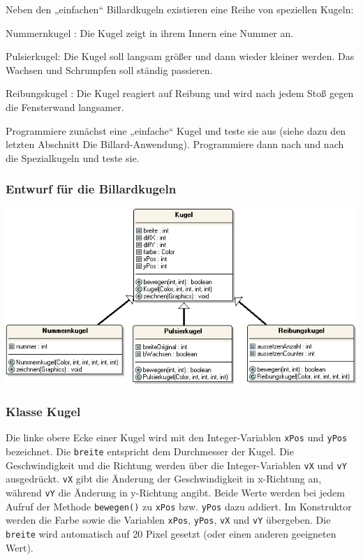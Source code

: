 Neben den „einfachen“ Billardkugeln existieren eine Reihe von speziellen Kugeln:

\begin{compactitem}
\item Nummernkugel : Die Kugel zeigt in ihrem Innern eine Nummer an.
\item Pulsierkugel: Die Kugel soll langsam größer und dann wieder kleiner
werden. Das Wachsen und Schrumpfen soll ständig passieren.
\item Reibungskugel : Die Kugel reagiert auf Reibung und wird nach jedem Stoß
gegen die Fensterwand langsamer.
\end{compactitem}

Programmiere zunächst eine „einfache“ Kugel und teste sie aus (siehe dazu den
letzten Abschnitt \glqq Die Billard-Anwendung\grqq ).
Programmiere dann nach und nach die Spezialkugeln und teste sie.


\subsubsection{Entwurf für die Billardkugeln}

\begin{center}
\includegraphics[width=1.0\textwidth]{./inf/SEKII/16_Java_Vererbung/Aufgabe6.png}
\end{center}


\subsubsection{Klasse Kugel}

Die linke obere Ecke einer Kugel wird mit den Integer-Variablen \verb|xPos| und
\verb|yPos| bezeichnet. Die \verb|breite| entspricht dem Durchmesser der Kugel.
Die Geschwindigkeit und die Richtung werden über die Integer-Variablen
\verb|vX| und \verb|vY| ausgedrückt. \verb|vX| gibt die Änderung der
Geschwindigkeit in x-Richtung an, während \verb|vY| die Änderung in
y-Richtung angibt. Beide Werte werden bei jedem Aufruf der Methode
\verb|bewegen()| zu \verb|xPos| bzw. \verb|yPos| dazu addiert. Im Konstruktor
werden die Farbe sowie die Variablen \verb|xPos|, \verb|yPos|, \verb|vX| und
\verb|vY| übergeben. Die \verb|breite| wird automatisch auf 20 Pixel gesetzt
(oder einen anderen geeigneten Wert).

